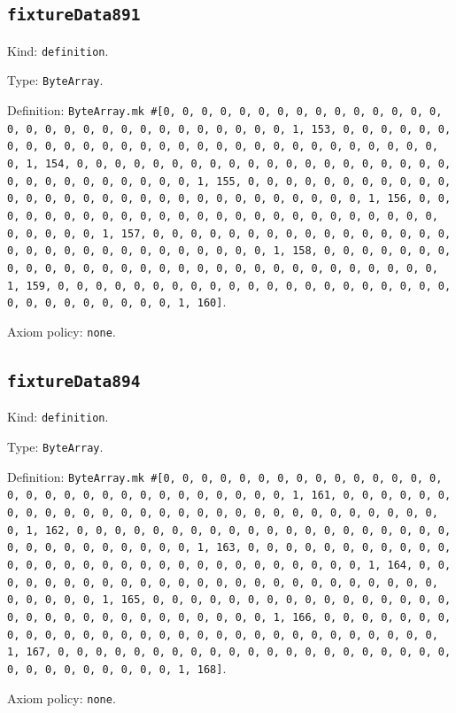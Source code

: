 \documentclass[11pt]{article}
\begin{document}
\subsection*{\texttt{fixtureData891}}
\noindent Kind: \texttt{definition}.\par
\noindent Type: \texttt{ByteArray}.\par
\noindent Definition: \texttt{ByteArray.mk \#[0, 0, 0, 0, 0, 0, 0, 0, 0, 0, 0, 0, 0, 0, 0, 0, 0, 0, 0, 0, 0, 0, 0, 0, 0, 0, 0, 0, 0, 0, 1, 153, 0, 0, 0, 0, 0, 0, 0, 0, 0, 0, 0, 0, 0, 0, 0, 0, 0, 0, 0, 0, 0, 0, 0, 0, 0, 0, 0, 0, 0, 0, 1, 154, 0, 0, 0, 0, 0, 0, 0, 0, 0, 0, 0, 0, 0, 0, 0, 0, 0, 0, 0, 0, 0, 0, 0, 0, 0, 0, 0, 0, 0, 0, 1, 155, 0, 0, 0, 0, 0, 0, 0, 0, 0, 0, 0, 0, 0, 0, 0, 0, 0, 0, 0, 0, 0, 0, 0, 0, 0, 0, 0, 0, 0, 0, 1, 156, 0, 0, 0, 0, 0, 0, 0, 0, 0, 0, 0, 0, 0, 0, 0, 0, 0, 0, 0, 0, 0, 0, 0, 0, 0, 0, 0, 0, 0, 0, 1, 157, 0, 0, 0, 0, 0, 0, 0, 0, 0, 0, 0, 0, 0, 0, 0, 0, 0, 0, 0, 0, 0, 0, 0, 0, 0, 0, 0, 0, 0, 0, 1, 158, 0, 0, 0, 0, 0, 0, 0, 0, 0, 0, 0, 0, 0, 0, 0, 0, 0, 0, 0, 0, 0, 0, 0, 0, 0, 0, 0, 0, 0, 0, 1, 159, 0, 0, 0, 0, 0, 0, 0, 0, 0, 0, 0, 0, 0, 0, 0, 0, 0, 0, 0, 0, 0, 0, 0, 0, 0, 0, 0, 0, 0, 0, 1, 160]}.\par
\noindent Axiom policy: \texttt{none}.\par
\subsection*{\texttt{fixtureData894}}
\noindent Kind: \texttt{definition}.\par
\noindent Type: \texttt{ByteArray}.\par
\noindent Definition: \texttt{ByteArray.mk \#[0, 0, 0, 0, 0, 0, 0, 0, 0, 0, 0, 0, 0, 0, 0, 0, 0, 0, 0, 0, 0, 0, 0, 0, 0, 0, 0, 0, 0, 0, 1, 161, 0, 0, 0, 0, 0, 0, 0, 0, 0, 0, 0, 0, 0, 0, 0, 0, 0, 0, 0, 0, 0, 0, 0, 0, 0, 0, 0, 0, 0, 0, 1, 162, 0, 0, 0, 0, 0, 0, 0, 0, 0, 0, 0, 0, 0, 0, 0, 0, 0, 0, 0, 0, 0, 0, 0, 0, 0, 0, 0, 0, 0, 0, 1, 163, 0, 0, 0, 0, 0, 0, 0, 0, 0, 0, 0, 0, 0, 0, 0, 0, 0, 0, 0, 0, 0, 0, 0, 0, 0, 0, 0, 0, 0, 0, 1, 164, 0, 0, 0, 0, 0, 0, 0, 0, 0, 0, 0, 0, 0, 0, 0, 0, 0, 0, 0, 0, 0, 0, 0, 0, 0, 0, 0, 0, 0, 0, 1, 165, 0, 0, 0, 0, 0, 0, 0, 0, 0, 0, 0, 0, 0, 0, 0, 0, 0, 0, 0, 0, 0, 0, 0, 0, 0, 0, 0, 0, 0, 0, 1, 166, 0, 0, 0, 0, 0, 0, 0, 0, 0, 0, 0, 0, 0, 0, 0, 0, 0, 0, 0, 0, 0, 0, 0, 0, 0, 0, 0, 0, 0, 0, 1, 167, 0, 0, 0, 0, 0, 0, 0, 0, 0, 0, 0, 0, 0, 0, 0, 0, 0, 0, 0, 0, 0, 0, 0, 0, 0, 0, 0, 0, 0, 0, 1, 168]}.\par
\noindent Axiom policy: \texttt{none}.\par
\end{document}
